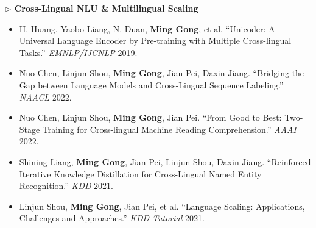 \documentclass[10.5pt,letterpaper]{article}
\begin{document}
\noindent\textcolor{blue!60!black}{\textbf{$\triangleright$ Cross-Lingual NLU \& Multilingual Scaling}}
\begin{itemize}
  \item H. Huang, Yaobo Liang, N. Duan, \textbf{Ming Gong}, et al. ``Unicoder: A Universal Language Encoder by Pre-training with Multiple Cross-lingual Tasks.'' \textit{EMNLP/IJCNLP} 2019.
  \item Nuo Chen, Linjun Shou, \textbf{Ming Gong}, Jian Pei, Daxin Jiang. ``Bridging the Gap between Language Models and Cross-Lingual Sequence Labeling.'' \textit{NAACL} 2022.
  \item Nuo Chen, Linjun Shou, \textbf{Ming Gong}, Jian Pei. ``From Good to Best: Two-Stage Training for Cross-lingual Machine Reading Comprehension.'' \textit{AAAI} 2022.
  \item Shining Liang, \textbf{Ming Gong}, Jian Pei, Linjun Shou, Daxin Jiang. ``Reinforced Iterative Knowledge Distillation for Cross-Lingual Named Entity Recognition.'' \textit{KDD} 2021.
  \item Linjun Shou, \textbf{Ming Gong}, Jian Pei, et al. ``Language Scaling: Applications, Challenges and Approaches.'' \textit{KDD Tutorial} 2021.
\end{itemize}

\end{document}
